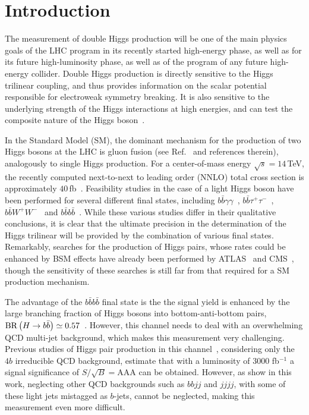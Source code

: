 \section{Introduction}

The measurement of double Higgs production will be one of the main
physics goals of the LHC program in its recently started high-energy
phase, as well as for its future high-luminosity phase, as
well as of the program of any future high-energy collider.
%
Double Higgs production is directly sensitive to the Higgs trilinear coupling, and thus 
provides information on the scalar potential responsible for electroweak symmetry breaking.
%
It is also sensitive to the underlying strength of the Higgs interactions
at high energies, and can test the composite nature of the 
Higgs boson~\cite{Giudice:2007fh,Contino:2010mh}.

In the Standard Model (SM), the dominant mechanism for the production of two Higgs bosons at the LHC is 
gluon fusion (see Ref.~\cite{baglio} and references therein), analogously to single Higgs production.
For a center-of-mass energy $\sqrt{s} = 14\,$TeV, the recently computed next-to-next to
leading order (NNLO)
total cross section is approximately $40\,$fb~\cite{deFlorian:2013jea}.
%
Feasibility studies in the case of a light Higgs boson have been performed for several different final states, including
$b\bar b\gamma\gamma$~\cite{Baur:2003gp,Barger:2013jfa},
$b\bar{b}\tau^+\tau^-$~\cite{Baur:2003gpa,Barr:2013tda,Dolan:2012rv,Dolan:2013rja},
$b\bar{b}W^+W^-$~\cite{Dolan:2012rv,Papaefstathiou:2012qe} and
$b\bar{b}b\bar{b}$~\cite{Baur:2003gpa,Dolan:2012rv,Gouzevitch:2013qca,Cooper:2013kia,Wardrope:2014kya,deLima:2014dta}.
%
While these various studies differ in their qualitative conclusions, it is clear
that the ultimate precision in the determination of the Higgs trilinear
will be provided by the combination of various final states.
%
Remarkably, searches for the production of Higgs pairs, whose rates
could be enhanced by BSM effects have already been performed
by ATLAS~\cite{Aad:2015uka} and CMS~\cite{Khachatryan:2015yea},
though the sensitivity of these searches is still far from
that required for a SM production mechanism.

The advantage of the $b\bar{b}b\bar{b}$ final state is the the signal yield
is enhanced by the large branching fraction of Higgs bosons into bottom-anti-bottom
pairs, ${\rm BR}\left( H\to b\bar{b}\right)\simeq 0.57$~\cite{Dittmaier:2012vm}.
%
However, this channel needs to deal with an overwhelming QCD multi-jet background,
which makes this measurement very challenging.
%
Previous studies of Higgs pair production in this
channel~\cite{Wardrope:2014kya,deLima:2014dta}, considering
only the $4b$ irreducible QCD background, estimate that with a luminosity of
3000 fb$^{-1}$ a signal significance of $S/\sqrt{B}=$AAA can be obtained.
%
However, as show in this work, neglecting other QCD backgrounds such as $bbjj$ and
$jjjj$, with some of these light jets mistagged as $b$-jets, cannot be neglected, making
this measurement even more difficult.

